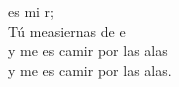 \begin{cancion}%
	 es mi r;  \\
	Tú measiernas de e\\
	y me es camir por las alas\\
	y me es camir por las alas.\\
\end{cancion}%

